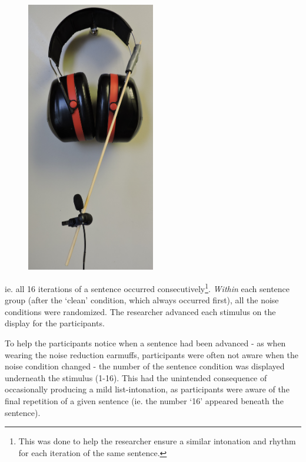 \DIFaddbegin \begin{figure}
\includegraphics[width=0.5\textwidth]{figure/earmuffSetup.JPG}
\caption{}
\label{fig:earmuffSetup}
\end{figure}
\DIFaddend ie. all 16 iterations of a sentence occurred consecutively\footnote{This was done to help the researcher ensure a similar intonation and rhythm for each iteration of the same sentence.}. \textit{Within} each sentence group (after the `clean' condition, which always occurred first), all the noise conditions were randomized. The researcher advanced each stimulus on the display for the participants.

To help the participants notice when a sentence had been advanced - as when wearing the noise reduction earmuffs, participants were often not aware when the noise condition changed - the number of the sentence condition was displayed underneath the stimulus (1-16).  This had the unintended consequence of occasionally producing a mild list-intonation, as participants were aware of the final repetition of a given sentence (ie. the number `16' appeared beneath the sentence). 


